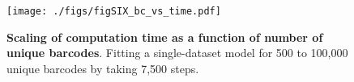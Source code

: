 \documentclass[
]{scrartcl}
\begin{document}
\begin{refsegment}
\begin{figure}

{\centering \texttt{[image: ./figs/figSIX\_bc\_vs\_time.pdf]}

}

\caption{\label{fig-SIX_bc_vs_time}\textbf{Scaling of computation time
as a function of number of unique barcodes}. Fitting a single-dataset
model for 500 to 100,000 unique barcodes by taking 7,500 steps.}

\end{figure}

\printbibliography[title={Supplemental References},
segment=\therefsegment, filter=notother]
\end{refsegment}
\end{document}
